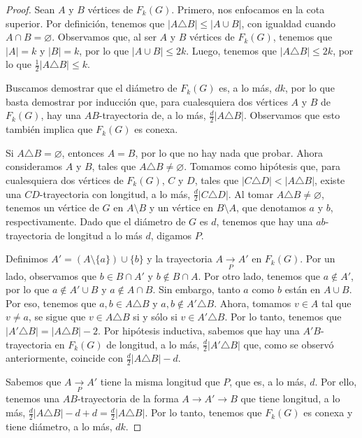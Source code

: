 \begin{proof}
    Sean $A$ y $B$ v\'ertices de $F_{k}(G)$. Primero, nos enfocamos en la cota
    superior. Por definici\'on, tenemos que $|A \triangle B| \leq |A \cup B|$,
    con igualdad cuando $A \cap B = \varnothing$. Observamos que, al ser $A$ y
    $B$ v\'ertices de $F_{k}(G)$, tenemos que $|A|=k$ y $|B|=k$, por lo que $|A
    \cup B| \le 2k$. Luego, tenemos que $|A \triangle B| \leq 2k$, por lo que
    $\frac{1}{2} |A \triangle B| \leq k$.

    Buscamos demostrar que el di\'ametro de $F_{k}(G)$ es, a lo m\'as, $d k$,
    por lo que basta demostrar por inducci\'on que, para cualesquiera dos
    v\'ertices $A$ y $B$ de $F_{k}(G)$, hay una $AB$-trayectoria de, a lo m\'as,
    $\frac{d}{2}|A\triangle B|$. Observamos que esto tambi\'en implica que
    $F_{k}(G)$ es conexa.

    Si $A\triangle B=\varnothing$, entonces $A=B$, por lo que no hay nada que
    probar. Ahora consideramos $A$ y $B$, tales que $A\triangle B \neq
    \varnothing$. Tomamos como hip\'otesis que, para cualesquiera dos v\'ertices
    de $F_{k}(G)$, $C$ y $D$, tales que $|C\triangle D|<|A \triangle B|$, existe
    una $CD$-trayectoria con longitud, a lo m\'as, $\frac{d}{2}|C\triangle D|$.
    Al tomar $A\triangle B \neq \varnothing$, tenemos un v\'ertice de $G$ en
    $A\setminus B$ y un v\'ertice en $B\setminus A$, que denotamos $a$ y $b$,
    respectivamente. Dado que el di\'ametro de $G$ es $d$, tenemos que hay una
    $ab$-trayectoria de longitud a lo m\'as $d$, digamos $P$.

    Definimos $A'=(A\setminus \{a\})\cup \{b\}$ y la trayectoria
    $A\xrightarrow[P]{} A'$ en $F_{k}(G)$. Por un lado, observamos que $b\in
    B\cap A'$ y $b\notin B\cap A$. Por otro lado, tenemos que $a \notin A'$, por
    lo que $a\notin A'\cup B$ y $a\notin A\cap B$. Sin embargo, tanto $a$ como
    $b$ est\'an en $A\cup B$. Por eso, tenemos que $a,b \in A\triangle B$ y $a,b
    \notin A'\triangle B$. Ahora, tomamos $v\in A$ tal que $v \neq a$, se sigue
    que $v \in A\triangle B$ si y s\'olo si $v\in A'\triangle B$. Por lo tanto,
    tenemos que $|A'\triangle B|=|A \triangle B|- 2$. Por hip\'otesis inductiva,
    sabemos que hay una $A'B$-trayectoria en $F_{k}(G)$ de longitud, a lo m\'as,
    $\frac{d}{2}|A'\triangle B|$ que, como se observ\'o anteriormente, coincide
    con $\frac{d}{2}|A\triangle B| - d$.

    Sabemos que $A\xrightarrow[P]{} A'$ tiene la misma longitud que $P$, que es,
    a lo m\'as, $d$. Por ello, tenemos una $AB$-trayectoria de la forma
    $A\rightarrow A'\rightarrow B$ que tiene longitud, a lo m\'as,
    $\frac{d}{2}|A\triangle B|-d +d =\frac{d}{2}|A\triangle B|$. Por lo tanto,
    tenemos que $F_{k}(G)$ es conexa y tiene di\'ametro, a lo m\'as, $d k$.


\end{proof}
